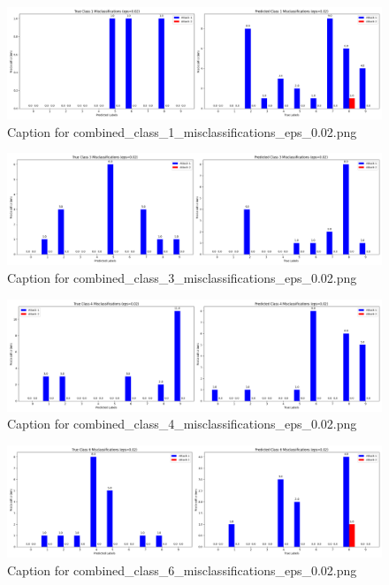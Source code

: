 \documentclass[11pt,onside]{article}
\begin{document}
\begin{figure}[ht]
\centering
\includegraphics[width=1\textwidth]{combined_class_boundary_pgd/combined_class_1_misclassifications_eps_0.02.png}
\caption{Caption for combined_class_1_misclassifications_eps_0.02.png}
\label{fig:combined_class_1_misclassifications_eps_0.02.png}
\end{figure}

\begin{figure}[ht]
\centering
\includegraphics[width=1\textwidth]{combined_class_boundary_pgd/combined_class_3_misclassifications_eps_0.02.png}
\caption{Caption for combined_class_3_misclassifications_eps_0.02.png}
\label{fig:combined_class_3_misclassifications_eps_0.02.png}
\end{figure}

\begin{figure}[ht]
\centering
\includegraphics[width=1\textwidth]{combined_class_boundary_pgd/combined_class_4_misclassifications_eps_0.02.png}
\caption{Caption for combined_class_4_misclassifications_eps_0.02.png}
\label{fig:combined_class_4_misclassifications_eps_0.02.png}
\end{figure}

\begin{figure}[ht]
\centering
\includegraphics[width=1\textwidth]{combined_class_boundary_pgd/combined_class_6_misclassifications_eps_0.02.png}
\caption{Caption for combined_class_6_misclassifications_eps_0.02.png}
\label{fig:combined_class_6_misclassifications_eps_0.02.png}
\end{figure}
\end{document}
